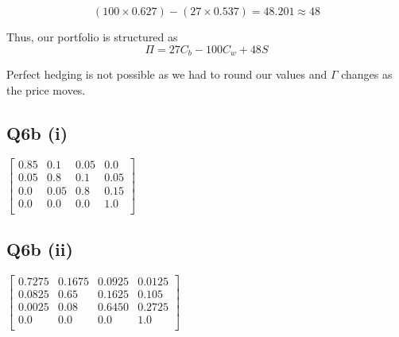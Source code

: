 \documentclass[a4paper]{article}[10pt]
\begin{document}
\begin{equation}
    (100 \times 0.627) - (27 \times 0.537) = 48.201 \approx 48
\end{equation}

Thus, our portfolio is structured as
\begin{equation}
    \Pi = 27C_b - 100C_w + 48S
\end{equation}

Perfect hedging is not possible as we had to round our values and $\Gamma$ changes as the price moves.

\subsection*{Q6b (i)}

\begin{center}
	$\begin{bmatrix}
		0.85 & 0.1 & 0.05 & 0.0 \\
		0.05 & 0.8 & 0.1 & 0.05 \\
		0.0 & 0.05 & 0.8 & 0.15 \\
		0.0 & 0.0 & 0.0 & 1.0 \\
	\end{bmatrix}$
\end{center}

\subsection*{Q6b (ii)}

\begin{center}
	$\begin{bmatrix}
		0.7275 & 0.1675 & 0.0925 & 0.0125 \\
		0.0825 & 0.65 & 0.1625 & 0.105 \\
		0.0025 & 0.08 & 0.6450 & 0.2725 \\
		0.0 & 0.0 & 0.0 & 1.0 \\
	\end{bmatrix}$
\end{center}
\end{document}

